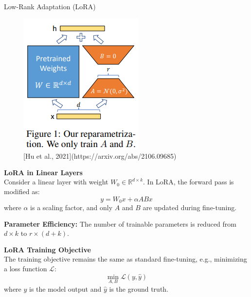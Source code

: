 \begin{frame}[allowframebreaks]{Low-Rank Adaptation (LoRA)}
\begin{figure}
    \centering
    \includegraphics[width=\linewidth,height=0.7\textheight,keepaspectratio]{images/adv-img-gen/lora-2.png} \\
    \small [Hu et al., 2021](https://arxiv.org/abs/2106.09685)
\end{figure}

\framebreak

\large \textbf{LoRA in Linear Layers}\\[0.5ex]
Consider a linear layer with weight $W_0 \in \mathbb{R}^{d \times k}$. In LoRA, the forward pass is modified as:
\begin{equation}
    y = W_0 x + \alpha A B x
\end{equation}
where $\alpha$ is a scaling factor, and only $A$ and $B$ are updated during fine-tuning.

\textbf{Parameter Efficiency:} The number of trainable parameters is reduced from $d \times k$ to $r \times (d + k)$.

\framebreak
\large \textbf{LoRA Training Objective}\\[0.5ex]
The training objective remains the same as standard fine-tuning, e.g., minimizing a loss function $\mathcal{L}$:
\begin{equation}
    \min_{A, B} \mathcal{L}(y, \hat{y})
\end{equation}
where $y$ is the model output and $\hat{y}$ is the ground truth.


\end{frame}
